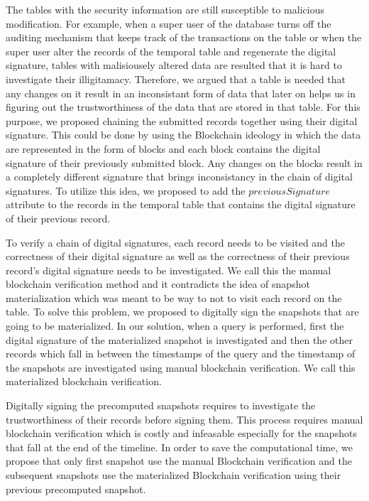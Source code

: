 		The tables with the security information are still susceptible to malicious modification. For example, when a super user of the database turns off the auditing mechanism that keeps track of the transactions on the table or when the super user alter the records of the temporal table and regenerate the digital signature, tables with malisiousely altered data are resulted that it is hard to investigate their illigitamacy. Therefore, we argued that a table is needed that any changes on it result in an inconsistant form of data that later on helps us in figuring out the trustworthiness of the data that are stored in that table. For this purpose, we proposed chaining the submitted records together using their digital signature. This could be done by using the Blockchain ideology in which the data are represented in the form of blocks and each block contains the digital signature of their previously submitted block. Any changes on the blocks result in a completely different signature that brings inconsistancy in the chain of digital signatures. To utilize this idea, we proposed to add the $previousSignature$ attribute to the records in the temporal table that contains the digital signature of their previous record.

		To verify a chain of digital signatures, each record needs to be visited and the correctness of their digital signature as well as the correctness of their previous record's digital signature needs to be investigated. We call this the manual blockchain verification method and it contradicts the idea of snapshot materialization which was meant to be way to not to visit each record on the table. To solve this problem, we proposed to digitally sign the snapshots that are going to be materialized. In our solution, when a query is performed, first the digital signature of the materialized snapshot is investigated and then the other records which fall in between the timestamps of the query and the timestamp of the snapshots are investigated using manual blockchain verification. We call this materialized blockchain verification.
		
		Digitally signing the precomputed snapshots requires to investigate the trustworthiness of their records before signing them. This process requires manual blockchain verification which is costly and infeasable especially for the snapshots that fall at the end of the timeline. In order to save the computational time, we propose that only first snapshot use the manual Blockchain verification and the subsequent snapshots use the materialized Blockchain verification using their previous precomputed snapshot.
